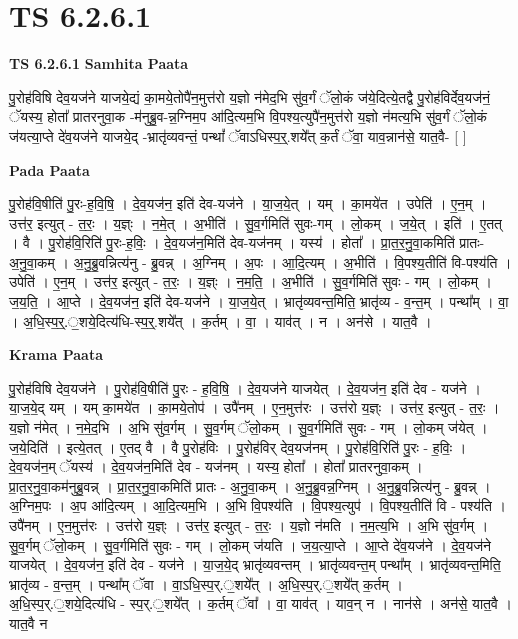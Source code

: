 \documentclass[17pt]{extarticle}
\begin{document}
\section{ TS 6.2.6.1 }

\textbf{TS 6.2.6.1 } \newline
\textbf{Samhita Paata} \newline

पु॒रोह॑विषि देव॒यज॑ने याजये॒द्यं का॒मये॒तोपै॑न॒मुत्त॑रो य॒ज्ञो न॑मेद॒भि सु॑व॒र्गं ॅलो॒कं ज॑ये॒दित्ये॒तद्वै पु॒रोह॑विर्देव॒यज॑नं॒ ॅयस्य॒ होता᳚ प्रातरनुवा॒क -म॑नुब्रु॒व-न्न॒ग्निम॒प आ॑दि॒त्यम॒भि वि॒पश्य॒त्युपै॑न॒मुत्त॑रो य॒ज्ञो न॑मत्य॒भि सु॑व॒र्गं ॅलो॒कं ज॑यत्या॒प्ते दे॑व॒यज॑ने याजये॒द् -भ्रातृ॑व्यवन्तं॒ पन्थां᳚ ॅवाऽधिस्प॒र्॒.शये᳚त् क॒र्तं ॅवा॒ याव॒न्नान॑से॒ यात॒वै- [  ] \newline

\textbf{Pada Paata} \newline

पु॒रोह॑वि॒षीति॑ पु॒रः-ह॒वि॒षि॒ । दे॒व॒यज॑न॒ इति॑ देव-यज॑ने । या॒ज॒ये॒त् । यम् । का॒मये॑त । उपेति॑ । ए॒न॒म् । उत्त॑र॒ इत्युत् - त॒रः॒ । य॒ज्ञ्ः । न॒मे॒त् । अ॒भीति॑ । सु॒व॒र्गमिति॑ सुवः-गम् । लो॒कम् । ज॒ये॒त् । इति॑ । ए॒तत् । वै । पु॒रोह॑वि॒रिति॑ पु॒रः-ह॒विः॒ । दे॒व॒यज॑न॒मिति॑ देव-यज॑नम् । यस्य॑ । होता᳚ । प्रा॒त॒र॒नु॒वा॒कमिति॑ प्रातः-अ॒नु॒वा॒कम् । अ॒नु॒ब्रु॒वन्नित्य॑नु - ब्रु॒वन्न् । अ॒ग्निम् । अ॒पः । आ॒दि॒त्यम् । अ॒भीति॑ । वि॒पश्य॒तीति॑ वि-पश्य॑ति । उपेति॑ । ए॒न॒म् । उत्त॑र॒ इत्युत् - त॒रः॒ । य॒ज्ञ्ः । न॒म॒ति॒ । अ॒भीति॑ । सु॒व॒र्गमिति॑ सुवः - गम् । लो॒कम् । ज॒य॒ति॒ । आ॒प्ते । दे॒व॒यज॑न॒ इति॑ देव-यज॑ने । या॒ज॒ये॒त् । भ्रातृ॑व्यवन्त॒मिति॒ भ्रातृ॑व्य - व॒न्त॒म् । पन्था᳚म् । वा॒ । अ॒धि॒स्प॒र्॒.॒शये॒दित्य॑धि-स्प॒र्॒.शये᳚त् । क॒र्तम् । वा॒ । याव॑त् । न । अन॑से । यात॒वै ।  \newline


\textbf{Krama Paata} \newline

पु॒रोह॑विषि देव॒यज॑ने । पु॒रोह॑वि॒षीति॑ पु॒रः - ह॒वि॒षि॒ । दे॒व॒यज॑ने याजयेत् । दे॒व॒यज॑न॒ इति॑ देव - यज॑ने । या॒ज॒ये॒द् यम् । यम् का॒मये॑त । का॒मये॒तोप॑ । उपै॑नम् । ए॒न॒मुत्त॑रः । उत्त॑रो य॒ज्ञ्ः । उत्त॑र॒ इत्युत् - त॒रः॒ । य॒ज्ञो न॑मेत् । न॒मे॒द॒भि । अ॒भि सु॑व॒र्गम् । सु॒व॒र्गम् ॅलो॒कम् । सु॒व॒र्गमिति॑ सुवः - गम् । लो॒कम् ज॑येत् । ज॒ये॒दिति॑ । इत्ये॒तत् । ए॒तद् वै । वै पु॒रोह॑विः । पु॒रोह॑विर् देव॒यज॑नम् । पु॒रोह॑वि॒रिति॑ पु॒रः - ह॒विः॒ । दे॒व॒यज॑न॒म् ॅयस्य॑ । दे॒व॒यज॑न॒मिति॑ देव - यज॑नम् । यस्य॒ होता᳚ । होता᳚ प्रातरनुवा॒कम् । प्रा॒त॒र॒नु॒वा॒कम॑नुब्रु॒वन्न् । प्रा॒त॒र॒नु॒वा॒कमिति॑ प्रातः - अ॒नु॒वा॒कम् । अ॒नु॒ब्रु॒वन्न॒ग्निम् । अ॒नु॒ब्रु॒वन्नित्य॑नु - ब्रु॒वन्न् । अ॒ग्निम॒पः । अ॒प आ॑दि॒त्यम् । आ॒दि॒त्यम॒भि । अ॒भि वि॒पश्य॑ति । वि॒पश्य॒त्युप॑ । वि॒पश्य॒तीति॑ वि - पश्य॑ति । उपै॑नम् । ए॒न॒मुत्त॑रः । उत्त॑रो य॒ज्ञ्ः । उत्त॑र॒ इत्युत् - त॒रः॒ । य॒ज्ञो न॑मति । न॒म॒त्य॒भि । अ॒भि सु॑व॒र्गम् । सु॒व॒र्गम् ॅलो॒कम् । सु॒व॒र्गमिति॑ सुवः - गम् । लो॒कम् ज॑यति । ज॒य॒त्या॒प्ते । आ॒प्ते दे॑व॒यज॑ने । दे॒व॒यज॑ने याजयेत् । दे॒व॒यज॑न॒ इति॑ देव - यज॑ने । या॒ज॒ये॒द् भ्रातृ॑व्यवन्तम् । भ्रातृ॑व्यवन्त॒म् पन्था᳚म् । भ्रातृ॑व्यवन्त॒मिति॒ भ्रातृ॑व्य - व॒न्त॒म् । पन्था᳚म् ॅवा । वा॒ऽधि॒स्प॒र्.॒शये᳚त् । अ॒धि॒स्प॒र्.॒शये᳚त् क॒र्तम् । अ॒धि॒स्प॒र्.॒शये॒दित्य॑धि - स्प॒र्.॒शये᳚त् । क॒र्तम् ॅवा᳚ । वा॒ याव॑त् । याव॒न् न । नान॑से । अन॑से॒ यात॒वै । यात॒वै न \newline
\end{document}
